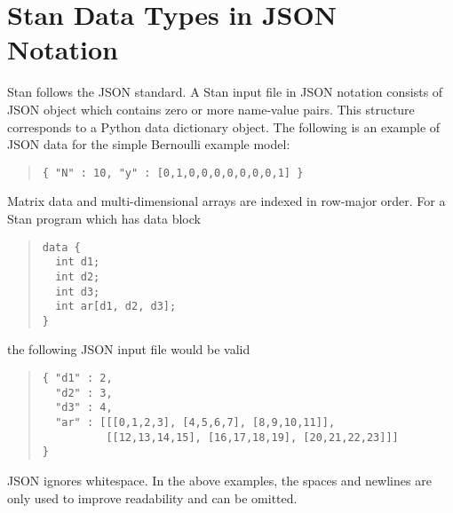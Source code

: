 \section{Stan Data Types in JSON Notation}

Stan follows the JSON standard.
A Stan input file in  JSON notation consists of  JSON object which contains zero
or more name-value pairs.  This structure corresponds to a Python data
dictionary object.  The following is an example of JSON data for the
simple Bernoulli example model:
\begin{quote}
\begin{Verbatim}
{ "N" : 10, "y" : [0,1,0,0,0,0,0,0,0,1] }
\end{Verbatim}
\end{quote}
Matrix data and multi-dimensional arrays are indexed in row-major
order.  For a Stan program which has data block
\begin{quote}
\begin{Verbatim}
data {
  int d1;
  int d2;
  int d3;
  int ar[d1, d2, d3];
}
\end{Verbatim}
\end{quote}
\noindent
the following JSON input file would be valid
\begin{quote}
\begin{Verbatim}
{ "d1" : 2,
  "d2" : 3,
  "d3" : 4,
  "ar" : [[[0,1,2,3], [4,5,6,7], [8,9,10,11]],
          [[12,13,14,15], [16,17,18,19], [20,21,22,23]]]
}
\end{Verbatim}
\end{quote}
JSON ignores whitespace. In the above examples,  the spaces and
newlines are only used to improve readability and can be omitted.

